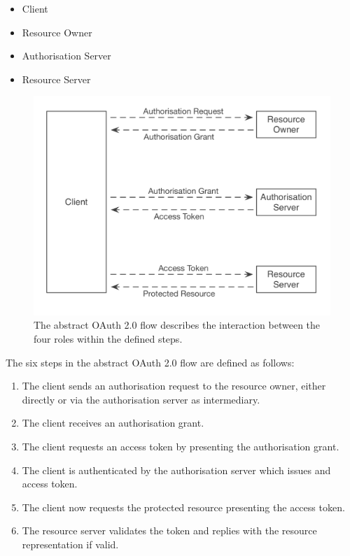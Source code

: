 \begin{itemize}
    \item Client
    \item Resource Owner
    \item Authorisation Server
    \item Resource Server
\end{itemize}

\begin{figure}
\includegraphics[width=\textwidth]{figures/OAuth2Flow.png}
\caption[OAuth 2.0 Flow.]{The abstract OAuth 2.0 flow describes the interaction between the four roles within the defined steps.
\label{fig:oauth2flow}}
\end{figure}

The six steps in the abstract OAuth 2.0 flow are defined as follows:
\begin{enumerate}
    \item The client sends an authorisation request to the resource owner, either directly or via the authorisation server as intermediary.
    \item The client receives an authorisation grant.
    \item The client requests an access token by presenting the authorisation grant.
    \item The client is authenticated by the authorisation server which issues and access token.
    \item The client now requests the protected resource presenting the access token.
    \item The resource server validates the token and replies with the resource representation if valid.
\end{enumerate}

